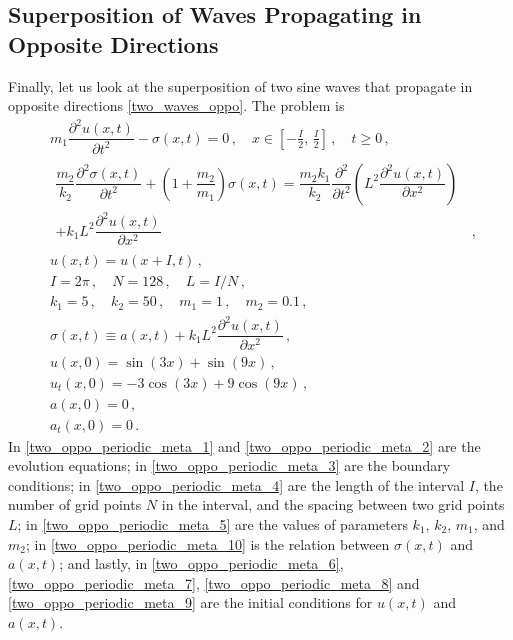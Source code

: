 \documentclass[11pt,a4paper,oneside,openright]{report} %
\begin{document}
\subsection{Superposition of Waves Propagating in Opposite Directions}
\noindent
Finally, let us look at the superposition of two sine waves that propagate in opposite directions \eqref{two_waves_oppo}. The problem is
\begin{subequations}\label{}
    \begin{align}
        & m_1 \dfrac{\partial^2 u(x,t)}{\partial t^2} - \sigma(x,t)  = 0 \, , \quad x \in \left[- \frac{I}{2}, \, \frac{I}{2} \right] \, , \quad t \geq 0 \, , \label{two_oppo_periodic_meta_1} \\[5pt]
        & \begin{aligned}
            \dfrac{m_2}{k_2} \dfrac{\partial^2 \sigma(x,t)}{\partial t^2}  + \left(1 + \dfrac{m_2}{m_1} \right) \sigma(x,t) = \dfrac{m_2 k_1}{k_2} \dfrac{\partial^2 }{\partial t^2 } \left(L^2 \dfrac{\partial^2 u(x,t)}{\partial x^2} \right) & \\ + k_1 L^2 \dfrac{\partial^2 u(x,t)}{\partial x^2} & \, ,
        \end{aligned} \label{two_oppo_periodic_meta_2} \\[5pt]
        & u(x, t) = u(x + I, t) \, , \label{two_oppo_periodic_meta_3} \\[5pt]
        & I = 2\pi \, , \quad N = 128 \, , \quad L = I/N \, , \label{two_oppo_periodic_meta_4} \\[5pt]
        & k_1 = 5 \, , \quad k_2 = 50 \, , \quad m_1 = 1 \, , \quad m_2 = 0.1 \, , \label{two_oppo_periodic_meta_5} \\[5pt]
        & \sigma(x,t) \equiv a(x,t) + k_1 L^2 \dfrac{\partial^2 u(x,t)}{\partial x^2} \, , \label{two_oppo_periodic_meta_10} \\[5pt]
        & u(x,0) = \sin{(3 x)} + \sin{(9 x)} \, , \label{two_oppo_periodic_meta_6} \\[5pt]
        & u_t(x,0) =  - 3 \cos{(3x)} + 9 \cos{(9x)} \, , \label{two_oppo_periodic_meta_7} \\[5pt]
        & a(x,0) = 0 \, , \label{two_oppo_periodic_meta_8} \\[5pt]
        & a_t(x,0) = 0 \, . \label{two_oppo_periodic_meta_9}
    \end{align}
\end{subequations}
In \eqref{two_oppo_periodic_meta_1} and \eqref{two_oppo_periodic_meta_2} are the evolution equations; in \eqref{two_oppo_periodic_meta_3} are the boundary conditions; in \eqref{two_oppo_periodic_meta_4} are the length of the interval $I$, the number of grid points $N$ in the interval, and the spacing between two grid points $L$; in \eqref{two_oppo_periodic_meta_5} are the values of parameters $k_1$, $k_2$, $m_1$, and $m_2$; in \eqref{two_oppo_periodic_meta_10} is the relation between $\sigma(x,t)$ and $a(x,t)$; and lastly, in \eqref{two_oppo_periodic_meta_6}, \eqref{two_oppo_periodic_meta_7}, \eqref{two_oppo_periodic_meta_8} and \eqref{two_oppo_periodic_meta_9} are the initial conditions for $u(x,t)$ and~$a(x,t)$.
\end{document}
